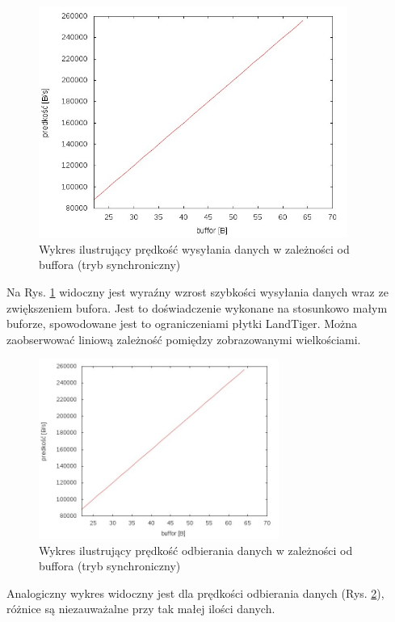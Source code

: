 \documentclass{BscUS}
\begin{document}
\newline
\begin{figure}[H]
{
\centering
\includegraphics[width=0.9\textwidth]{./img/S_107374200Send}
\caption{Wykres ilustrujący prędkość wysyłania danych w zależności od buffora (tryb synchroniczny)}
\label{fig:S_107374200Send}
}
\end{figure}
\noindent Na Rys. \ref{fig:S_107374200Send} widoczny jest wyraźny wzrost szybkości wysyłania danych wraz ze zwiększeniem bufora. Jest to doświadczenie wykonane na stosunkowo małym buforze, spowodowane jest to ograniczeniami płytki LandTiger. Można zaobserwować liniową zależność pomiędzy zobrazowanymi wielkościami.
\begin{figure}[H]
{
\centering
\includegraphics[width=0.7\textwidth]{./img/S_107374200Receive}
\caption{Wykres ilustrujący prędkość odbierania danych w zależności od buffora (tryb synchroniczny)}
\label{fig:S_107374200Receive}
}
\end{figure}
\noindent Analogiczny wykres widoczny jest dla prędkości odbierania danych (Rys. \ref{fig:S_107374200Receive}), różnice są niezauważalne przy tak małej ilości danych.
\end{document}
